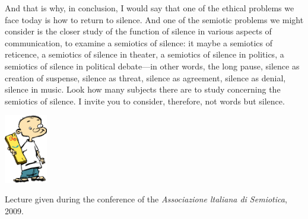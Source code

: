 \documentclass[11pt,twocolumn]{article}
\begin{document}
And that is why, in conclusion, I would say that one of the ethical
problems we face today is how to return to silence. And one of the
semiotic problems we might consider is the closer study of the
function of silence in various aspects of communication, to examine
a semiotics of silence: it maybe a semiotics of reticence, a
semiotics of silence in theater, a semiotics of silence in politics,
a semiotics of silence in political debate---in other words, the long
pause, silence as creation of suspense, silence as threat, silence
as agreement, silence as denial, silence in music. Look how many
subjects there are to study concerning the semiotics of silence.
I invite you to consider, therefore, not words but silence.

\vspace{1.25cm}
\centerline{\includegraphics[height=3cm]{../../images/Jonny-Plank.png}}
\vspace{0.5cm}
\noindent Lecture given during the conference of the \emph{Associazione ltaliana di Semiotica}, 2009.
\end{document}
